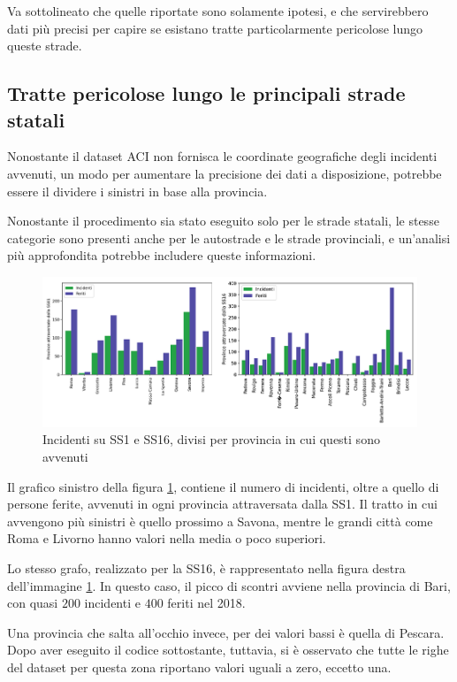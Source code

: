\documentclass[a4paper,12pt]{report}
\begin{document}
Va sottolineato che quelle riportate sono solamente ipotesi, e che servirebbero 
dati più precisi per capire se esistano tratte particolarmente 
pericolose lungo queste strade. 

\subsection{Tratte pericolose lungo le principali strade statali}

Nonostante il dataset ACI non fornisca le coordinate geografiche degli incidenti avvenuti, 
un modo per aumentare la precisione dei dati a disposizione, potrebbe essere il 
dividere i sinistri in base alla provincia. 

Nonostante il procedimento sia stato eseguito solo per le strade statali, le stesse categorie 
sono presenti anche per le autostrade e le strade provinciali, e un'analisi più 
approfondita potrebbe includere queste informazioni. 

\begin{figure}
    \includegraphics[width=\linewidth]{img_unite/tratti_ss1_ss16.png}
    \caption{Incidenti su SS1 e SS16, divisi per provincia in cui questi sono avvenuti}
    \label{fig:incidenti-strade-statali}
\end{figure}

Il grafico sinistro della figura \ref{fig:incidenti-strade-statali}, 
contiene il numero di incidenti, oltre a quello di persone ferite, 
avvenuti in ogni provincia attraversata dalla SS1. 
Il tratto in cui avvengono più sinistri è quello prossimo a Savona, 
mentre le grandi città come 
Roma e Livorno hanno valori nella media o poco superiori. 

Lo stesso grafo, realizzato per la SS16, è rappresentato nella figura destra dell'immagine 
\ref{fig:incidenti-strade-statali}. 
In questo caso, il picco di scontri avviene nella provincia 
di Bari, con quasi $200$ incidenti e $400$ feriti nel 2018. 

Una provincia che salta all'occhio invece, per dei valori bassi è quella di Pescara. 
Dopo aver eseguito il codice sottostante, tuttavia, si è osservato che tutte le righe 
del dataset per questa zona riportano valori uguali a zero, eccetto una. 
\end{document}
